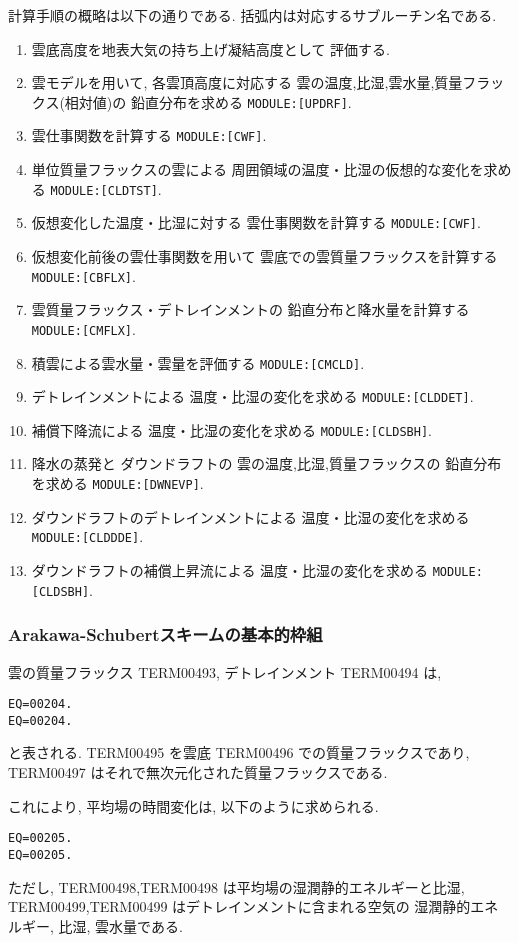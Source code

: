 計算手順の概略は以下の通りである.
括弧内は対応するサブルーチン名である.
%
\begin{enumerate}
\item 雲底高度を地表大気の持ち上げ凝結高度として
      評価する.
\item 雲モデルを用いて, 
      各雲頂高度に対応する
      雲の温度,比湿,雲水量,質量フラックス(相対値)の
      鉛直分布を求める \texttt{MODULE:[UPDRF]}.
\item 雲仕事関数を計算する \texttt{MODULE:[CWF]}.
\item 単位質量フラックスの雲による
      周囲領域の温度・比湿の仮想的な変化を求める \texttt{MODULE:[CLDTST]}.
\item 仮想変化した温度・比湿に対する
      雲仕事関数を計算する \texttt{MODULE:[CWF]}.
\item 仮想変化前後の雲仕事関数を用いて
      雲底での雲質量フラックスを計算する \texttt{MODULE:[CBFLX]}.
\item 雲質量フラックス・デトレインメントの
      鉛直分布と降水量を計算する \texttt{MODULE:[CMFLX]}.
\item 積雲による雲水量・雲量を評価する \texttt{MODULE:[CMCLD]}.
\item デトレインメントによる
      温度・比湿の変化を求める \texttt{MODULE:[CLDDET]}.
\item 補償下降流による
      温度・比湿の変化を求める \texttt{MODULE:[CLDSBH]}.
\item 降水の蒸発と
      ダウンドラフトの
      雲の温度,比湿,質量フラックスの
      鉛直分布を求める \texttt{MODULE:[DWNEVP]}.
\item ダウンドラフトのデトレインメントによる
      温度・比湿の変化を求める \texttt{MODULE:[CLDDDE]}.      
\item ダウンドラフトの補償上昇流による
      温度・比湿の変化を求める \texttt{MODULE:[CLDSBH]}.
\end{enumerate}

\subsubsection{Arakawa-Schubertスキームの基本的枠組}

雲の質量フラックス TERM00493, デトレインメント TERM00494 は, 
\begin{verbatim}
EQ=00204.
EQ=00204.
\end{verbatim}
と表される. 
TERM00495 を雲底 TERM00496 での質量フラックスであり,
TERM00497 はそれで無次元化された質量フラックスである.

これにより, 平均場の時間変化は, 以下のように求められる.
\begin{verbatim}
EQ=00205.
EQ=00205.
\end{verbatim}
ただし, TERM00498,TERM00498 は平均場の湿潤静的エネルギーと比湿,
TERM00499,TERM00499 はデトレインメントに含まれる空気の
湿潤静的エネルギー, 比湿, 雲水量である.

